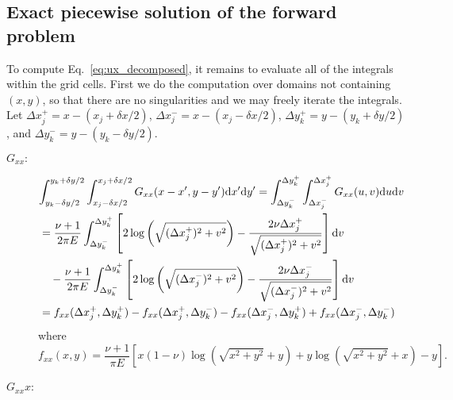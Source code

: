 \documentclass{article}
\newcommand{\dd}{\mathrm{d}}
\begin{document}
\subsection{Exact piecewise solution of the forward problem}

To compute Eq.~\ref{eq:ux_decomposed}, it remains to evaluate all of the integrals within the grid cells. First we do the computation over domains not containing $(x,y)$, so that there are no singularities and we may freely iterate the integrals. Let $\Delta x_j^+ = x-(x_j + \delta x/2)$, $\Delta x_j^- = x-(x_j-\delta x/2)$, $\Delta y_k^+ = y-(y_k + \delta y/2)$, and $\Delta y_k^- = y-(y_k-\delta y/2)$. 

\begin{description}

\item[$G_{xx}:$]
\begin{align}
\lefteqn{
\int_{y_k-\delta y/2}^{y_k+\delta y/2}  \int_{x_j-\delta x/2}^{x_j+\delta x/2} G_{xx}(x-x',y-y')\dd x'  \dd y'=  \int_{\Delta y_{k}^-}^{\Delta y_k^+}  \int_{\Delta x_j^-}^{\Delta x_j^+} G_{xx}(u,v) \dd u \dd v} \nonumber \\
&= \frac{\nu+1}{2\pi E}\int_{\Delta y_{k}^-}^{\Delta y_k^+}\left[ 2\log\left( \sqrt{ (\Delta x_j^+)^2 + v^2 } \right) - \frac{2\nu \Delta x_j^+}{\sqrt{ (\Delta x_j^+)^2 + v^2 }}  \right] \dd v \nonumber \\
& \quad -  \frac{\nu+1}{2\pi E}\int_{\Delta y_{k}^-}^{\Delta y_k^+}\left[ 2\log\left( \sqrt{ (\Delta x_j^-)^2 + v^2 } \right) - \frac{2\nu \Delta x_j^-}{\sqrt{ (\Delta x_j^-)^2 + v^2 }}  \right] \dd v \nonumber \\
&= f_{xx}( \Delta x_j^+,\Delta y_k^+) - f_{xx}( \Delta x_j^+,\Delta y_k^-) -f_{xx}(\Delta x_j^-, \Delta y_k^+) + f_{xx}(\Delta x_j^- , \Delta y_k^-)
\end{align}
where
\begin{equation}
f_{xx}(x,y) = \frac{\nu+1}{\pi E}\left[ x(1-\nu ) \log\left( \sqrt{x^2+y^2}+y\right) + y \log\left(\sqrt{x^2+y^2} +x\right)-y  \right].
\end{equation}

\item[$G_{xx}x$:]


\end{description}
\end{document}

